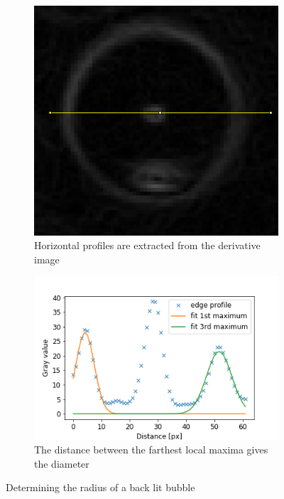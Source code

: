 			\begin{figure}
				\centering

				\begin{subfigure}[t]{.4\textwidth}
					\centering
					\includegraphics[scale=0.3]{images/green_edges.png}
					\caption{Horizontal profiles are extracted from the derivative image}
				\end{subfigure}\hfill
				\begin{subfigure}[t]{.5\textwidth}
					\centering
					\includegraphics[scale=.6]{graphs/green_radius_demo.png}
					\caption{The distance between the farthest local maxima gives the diameter}
				\end{subfigure}
				
				\caption{Determining the radius of a back lit bubble}								
				\label{fig:green_radius}
			\end{figure}
			
